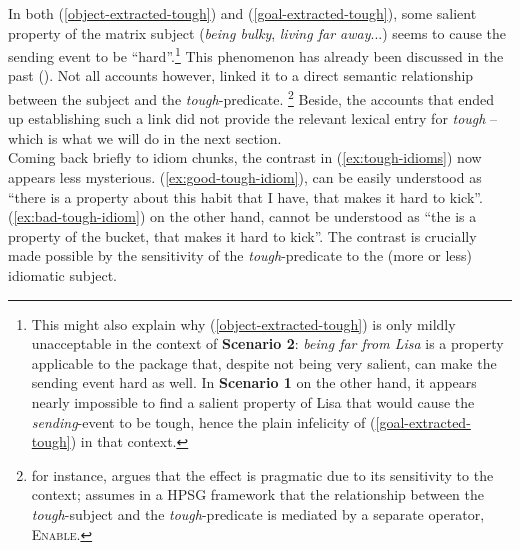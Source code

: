 \documentclass[11pt]{article}
\begin{document}
In both (\ref{object-extracted-tough}) and
(\ref{goal-extracted-tough}), some salient property of the matrix subject (\textit{being bulky}, \textit{living far away}...) seems to cause the sending event to be ``hard''.\footnote{This might also explain why (\ref{object-extracted-tough}) is only mildly unacceptable in the context of \textbf{Scenario 2}: \textit{being far from Lisa} is a property applicable to the package that, despite not being	very salient, can make the sending event hard as well. In \textbf{Scenario 1} on the other hand, it appears nearly impossible to find a salient property of Lisa that would cause the \textit{sending}-event to be tough, hence the plain infelicity of (\ref{goal-extracted-tough}) in that context.} This phenomenon has already been discussed in the past (\cite{Bayer1990,Goh2000b,Grover1995,Hukari1990,Kim1995,Schachter1981}). Not all accounts however, linked it to a direct semantic relationship between the subject and the \textit{tough}-predicate. \footnote{\cite{Goh2000b} for instance, argues that the effect is pragmatic due to its sensitivity to the context; \cite{Grover1995} assumes in a HPSG framework that the relationship between the \textit{tough}-subject and the \textit{tough}-predicate is mediated by a separate operator, \textsc{Enable}.} Beside, the accounts that ended up establishing such a link did not provide the relevant lexical entry for \textit{tough} -- which is what we will do in the next section.\\

Coming back briefly to idiom chunks, the contrast in (\ref{ex:tough-idioms}) now appears less mysterious. (\ref{ex:good-tough-idiom}), can be easily understood as ``there is a property about this habit that I have, that makes it hard to kick''. (\ref{ex:bad-tough-idiom}) on the other hand, cannot be understood as ``the is a property of the bucket, that makes it hard to kick''. The contrast is crucially made possible by the sensitivity of the \textit{tough}-predicate to the (more or less) idiomatic subject. 
\end{document}
